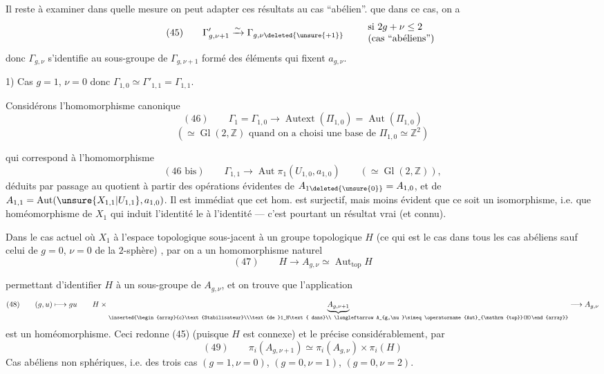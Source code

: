 Il reste à examiner dans quelle mesure on peut adapter ces résultats au cas ``abélien''.   que dans ce cas, on a
\[
(45)\qquad \Gamma'_{g,\nu+1}\xrightarrow{\sim}\Gamma_{g,\nu\deleted{\unsure{+1}}}
\qquad\begin{array}{l}
\text{si }2g+\nu\leq2\\
\text{(cas ``abéliens'')}
\end{array}
\]
donc $\Gamma_{g,\nu}$ s'identifie au sous-groupe de $\Gamma_{g,\nu+1}$ formé des éléments qui fixent $a_{g,\nu}$.

1) Cas $g=1$, $\nu=0$ donc $\Gamma_{1,0}\simeq\Gamma'_{1,1}=\Gamma_{1,1}$.

Considérons l'homomorphisme canonique
\[
(46)\qquad \Gamma_1=\Gamma_{1,0}\longrightarrow\operatorname{Autext}(\Pi_{1,0})=\operatorname{Aut}(\Pi_{1,0})
\]
\[
(\simeq\operatorname{Gl}(2,\mathbb{Z})\text{ quand on a choisi une base de }\Pi_{1,0}\simeq\mathbb{Z}^2)
\]

qui correspond à l'homomorphisme
\[
(46\text{ bis})\qquad\Gamma_{1,1}\longrightarrow\operatorname{Aut}\pi_1(U_{1,0},a_{1,0})
\qquad(\simeq\operatorname{Gl}(2,\mathbb{Z})),
\]
déduits  par passage au quotient à partir des  opérations évidentes de $A_{1\deleted{\unsure{0}}}=A_{1,0}$, et de
$A_{1,1}=\operatorname{Aut}(\unsure{X_{1,1}|U_{1,1}},a_{1,0})$.
Il est immédiat que cet hom. est surjectif, mais moins évident que ce soit un isomorphisme, i.e. que  homéomorphisme de $X_1$ qui induit l'identité  le    à l'identité --- c'est pourtant un résultat vrai (et connu).

Dans le cas actuel où  $X_1$   à l'espace topologique sous-jacent à un groupe topologique $H$ (ce qui est le cas dans tous les cas abéliens sauf celui de $g=0$, $\nu=0$ de la $2$-sphère) , par  on a un homomorphisme naturel
\[
(47)\qquad H\longrightarrow A_{g,\nu}\simeq\operatorname{Aut}_{\mathrm{top}}H
\]

permettant d'identifier $H$ à un sous-groupe  de $A_{g,\nu}$, et on trouve que l'application
\[
(48)\qquad (g,u)\longmapsto gu\qquad
H\times\underbrace{A_{g,\nu+1}}_{\inserted{\begin{array}{c}\text{Stabilisateur}\\\text{de }1_H\text{ dans}\\ \longleftarrow A_{g,\nu}\simeq\operatorname{Aut}_{\mathrm{top}}(H)\end{array}}}
\longrightarrow A_{g,\nu}
\]
est un homéomorphisme.  Ceci  redonne (45) (puisque $H$ est connexe)
et le précise considérablement, par
\[
(49)\qquad\pi_i(A_{g,\nu+1})\simeq\pi_i(A_{g,\nu})\times\pi_i(H)
\]
Cas abéliens non sphériques, i.e.  des trois cas $(g=1,\nu=0)$, $(g=0,\nu=1)$, $(g=0,\nu=2)$.

